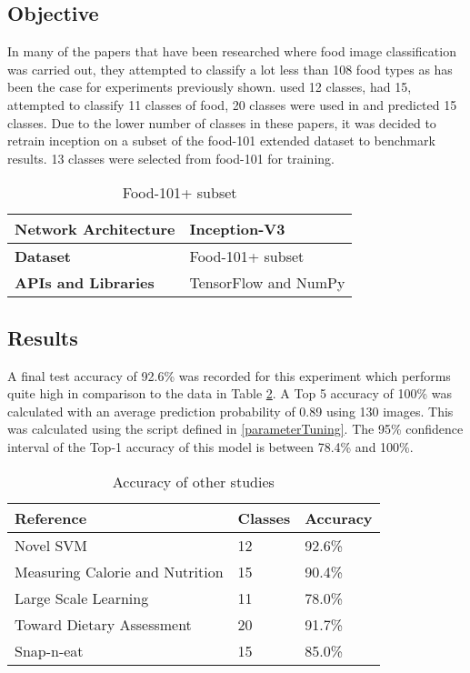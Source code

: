 \tocless\subsection{Objective}
In many of the papers that have been researched where food image classification was carried out, they attempted to classify a lot less than 108 food types as has been the case for experiments previously shown.
\parencite{novelSVM} used 12 classes, \parencite{pouladzadeh2014measuring} had 15, \parencite{LSL_2015} attempted to classify 11 classes of food, 20 classes were used in \parencite{chen2010toward} and \parencite{snap} predicted 15 classes.
Due to the lower number of classes in these papers, it was decided to retrain inception on a subset of the food-101 extended dataset to benchmark results.
13 classes were selected from food-101 for training.

\begin{table}[h]
\centering
\caption{Food-101+ subset}
\label{my-label}
\begin{tabular}{|l|p{8cm}|}
\hline
\textbf{Network Architecture} & Inception-V3          \\ \hline
\textbf{Dataset}              & Food-101+ subset  \\ \hline
\textbf{APIs and Libraries}   & TensorFlow and NumPy                                                       \\ \hline
\end{tabular}
\end{table}

\tocless\subsection{Results}
A final test accuracy of 92.6\% was recorded for this experiment which performs quite high in comparison to the data in Table \ref{classes_accuracy}.
A Top 5 accuracy of 100\% was calculated with an average prediction probability of 0.89 using 130 images.
This was calculated using the script defined in \ref{parameterTuning}.
The 95\% confidence interval of the Top-1 accuracy of this model is between 78.4\% and 100\%.

\begin{table}[]
\centering
\caption{Accuracy of other studies}
\label{classes_accuracy}
\begin{tabular}{|l|l|l|}
\hline
\textbf{Reference}                       & \textbf{Classes} & \textbf{Accuracy}      \\ \hline
Novel SVM                       & 12      & 92.6\%        \\ \hline
Measuring Calorie and Nutrition & 15      & 90.4\%       \\ \hline
Large Scale Learning            & 11      & 78.0\%          \\ \hline
Toward Dietary Assessment       & 20      & 91.7\% \\ \hline
Snap-n-eat                      & 15      & 85.0\%         \\ \hline
\end{tabular}
\end{table}

